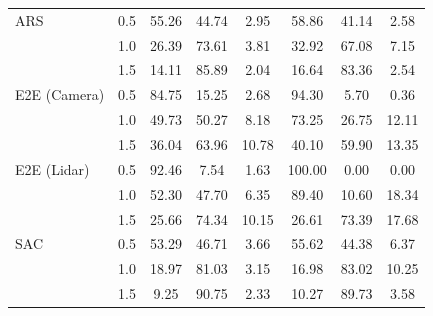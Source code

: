 \documentclass[manuscript,screen,review]{acmart}
\begin{document}
\begin{table}
{\begin{tabular}{llccc|ccc}
ARS & 0.5 & 55.26 &  44.74 &   2.95  &    58.86   & 41.14 & 2.58  \\
    & 1.0 &    26.39 &  73.61 &   3.81 &    32.92 &  67.08 &  7.15  \\
    & 1.5 &    14.11 &  85.89 &   2.04 &    16.64 &  83.36 &   2.54 \\
E2E (Camera) & 0.5 & 84.75 &  15.25 &   2.68 &   94.30 & 5.70 &   0.36 \\
    & 1.0 &    49.73 &  50.27 &   8.18 &    73.25 & 26.75 &  12.11 \\
    & 1.5 &    36.04 &  63.96 &  10.78 &    40.10 & 59.90 &  13.35 \\
E2E (Lidar) & 0.5 &    92.46 &   7.54 &   1.63 &  100.00 &  0.00 &   0.00 \\
    & 1.0 &    52.30 &  47.70 &   6.35 &    89.40 &  10.60 &  18.34 \\
    & 1.5 &     25.66 &  74.34 &  10.15 &    26.61 &  73.39 &  17.68 \\
SAC & 0.5 &    53.29 &  46.71 &   3.66 &    55.62 &  44.38 &   6.37 \\
    & 1.0 &    18.97 &   81.03 &   3.15 &    16.98 &  83.02 &  10.25 \\
    & 1.5 &    9.25 &   90.75 &   2.33 &    10.27 &   89.73 &   3.58 \\
\end{tabular}
 \label{tab:simulation_conservative}}
\end{table}%
\end{document}
